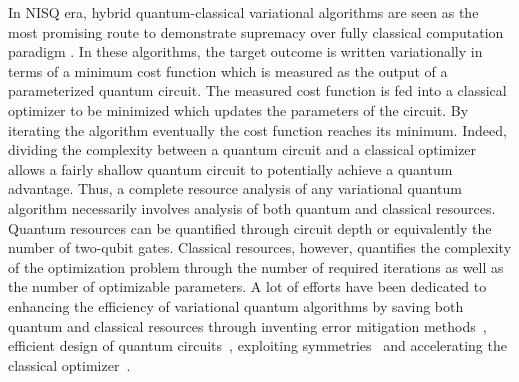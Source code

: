 \documentclass[aps, pra, reprint, superscriptaddress]{revtex4-1}
\begin{document}
In NISQ era, hybrid quantum-classical variational algorithms are seen as the most promising route to demonstrate supremacy over fully classical computation paradigm \cite{peruzzo2014variational,cerezo_variational_2021}. 
In these algorithms, the target outcome is written variationally in terms of a minimum cost function which is measured as the output of a parameterized quantum circuit. 
The measured cost function is fed into a classical optimizer to be minimized which updates the parameters of the circuit. By iterating the algorithm eventually the cost function reaches its  minimum. Indeed, dividing the complexity between a quantum circuit and a classical optimizer allows a fairly shallow quantum circuit to potentially achieve a quantum advantage. Thus, a complete resource analysis of any variational quantum algorithm necessarily involves analysis of both quantum and classical resources. 
Quantum resources can be 
quantified through circuit depth or equivalently the number of two-qubit gates. Classical resources, however, quantifies the complexity of the optimization problem through the number of required iterations as well as the number of optimizable parameters. A lot of efforts have been dedicated to enhancing the efficiency of variational quantum algorithms by saving both quantum and classical resources through inventing error mitigation methods~\cite{temme_error_2017,sagastizabal2019experimental,ravi2022vaqem,PhysRevX.8.031027,qin2022overview}, efficient design of quantum circuits~\cite{liu2019variational,huang2022robust}, exploiting symmetries~\cite{Kazuhiro2020Symmetry,gard2020efficient,Lyu2023symmetry,han2023multi} and accelerating the classical optimizer~\cite{lyu2020accelerated,alam2020accelerating,sweke2020stochastic,muller2022accelerating}. 
\end{document}
